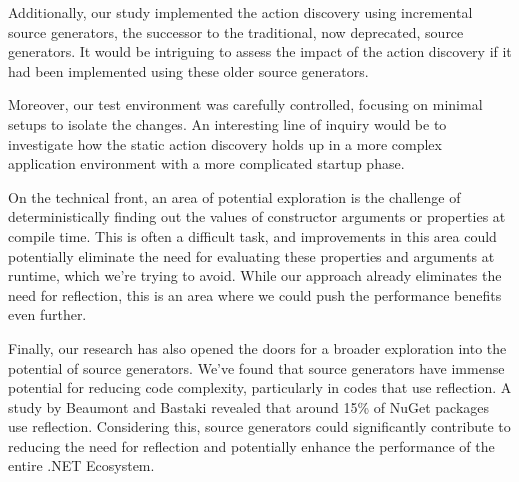 Additionally, our study implemented the action discovery using incremental source generators, the successor to the traditional, now deprecated, source generators. It would be intriguing to assess the impact of the action discovery if it had been implemented using these older source generators.

Moreover, our test environment was carefully controlled, focusing on minimal setups to isolate the changes. An interesting line of inquiry would be to investigate how the static action discovery holds up in a more complex application environment with a more complicated startup phase.

On the technical front, an area of potential exploration is the challenge of deterministically finding out the values of constructor arguments or properties at compile time. This is often a difficult task, and improvements in this area could potentially eliminate the need for evaluating these properties and arguments at runtime, which we're trying to avoid. While our approach already eliminates the need for reflection, this is an area where we could push the performance benefits even further.

Finally, our research has also opened the doors for a broader exploration into the potential of source generators. We've found that source generators have immense potential for reducing code complexity, particularly in codes that use reflection. A study by Beaumont and Bastaki \cite{Beaumont2022} revealed that around 15\% of NuGet packages use reflection. Considering this, source generators could significantly contribute to reducing the need for reflection and potentially enhance the performance of the entire .NET Ecosystem.
